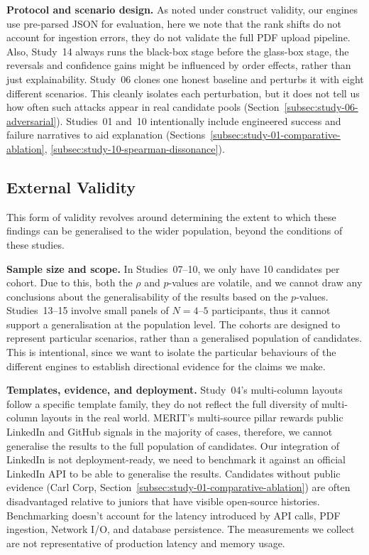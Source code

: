\textbf{Protocol and scenario design.}
As noted under construct validity, our engines use pre-parsed JSON for evaluation, here we note
that the rank shifts do not account for ingestion errors, they do not validate the full PDF upload pipeline.
Also, Study~14 always runs the black-box stage before the glass-box stage, the reversals and confidence
gains might be influenced by order effects, rather than just explainability.
Study~06 clones one honest baseline and perturbs it with eight different scenarios. This cleanly isolates
each perturbation, but it does not tell us how often such attacks appear in real candidate pools (Section~\ref{subsec:study-06-adversarial}).
Studies~01 and~10 intentionally include engineered success and failure narratives to aid explanation 
(Sections~\ref{subsec:study-01-comparative-ablation}, 
\ref{subsec:study-10-spearman-dissonance}).

\subsection{External Validity}
\label{subsec:external-validity}

This form of validity revolves around determining the extent to which these findings can be generalised to the wider population,
beyond the conditions of these studies.

\textbf{Sample size and scope.}
In Studies~07--10, we only have 10 candidates per cohort. Due to this,
both the $\rho$ and $p$-values are volatile, and we cannot draw any conclusions about the generalisability 
of the results based on the $p$-values.
Studies~13--15 involve small panels of $N = 4$--$5$ participants, thus it cannot support a generalisation
at the population level.
The cohorts are designed to represent particular scenarios, rather than a generalised population of candidates.
This is intentional, since we want to isolate the particular behaviours of the different engines to establish
directional evidence for the claims we make.

\textbf{Templates, evidence, and deployment.}
Study~04's multi-column layouts follow a specific template family, they do not reflect the
full diversity of multi-column layouts in the real world. MERIT's multi-source pillar rewards
public LinkedIn and GitHub signals in the majority of cases, therefore, we cannot generalise 
the results to the full population of candidates. Our integration of LinkedIn is not deployment-ready,
we need to benchmark it against an official LinkedIn API to be able to generalise the results.
Candidates without public evidence (Carl Corp, Section~\ref{subsec:study-01-comparative-ablation})
are often disadvantaged relative to juniors that have visible open-source histories.
Benchmarking doesn't account for the latency introduced by API calls, PDF ingestion, Network I/O, and database persistence.
The measurements we collect are not representative of production latency and memory usage.

